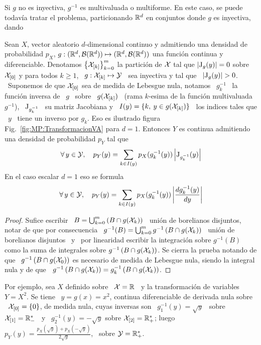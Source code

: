 Si $g$ no es inyectiva, $g^{-1}$  es multivaluada o multiforme. En este caso, se
puede todav\'ia  tratar el problema, particionando $\mathbb{R}^d$  en conjuntos donde
$g$ es inyectiva, dando
%
\begin{teorema}
  Sean $X$, vector aleatorio  $d$-dimensional continuo y admitiendo una densidad
  de  probabilidad   $p_X$,  $g:(\mathbb{R}^d  ,  \mathcal{B}(\mathbb{R}^d))   \mapsto  (\mathbb{R}^d  ,
  \mathcal{B}(\mathbb{R}^d))$  una  funci\'on continua  y  diferenciable.  Denotamos  $\left\{
    \mathcal{X}_{[k]} \right\}_{k=0}^m$ la partici\'on  de $\mathcal{X}$ tal que $\left| \operatorname{J}_g(y)
  \right| = 0$ sobre  $\mathcal{X}_{[0]}$ y para todos $k \ge 1$,  \ $g: \mathcal{X}_{[k]} \mapsto
  \mathcal{Y}$ \ sea inyectiva y tal que \ $\left| \operatorname{J}_g(y) \right| > 0$. \ Suponemos de
  que  $\mathcal{X}_{[0]}$ sea  de medida  de Lebesgue  nula, notamos  \ $g_k^{-1}$  \ la
  funci\'on inversa  de \ $g$  \ sobre \  $g(\mathcal{X}_{[k]})$ \ (rama $k$-esima  de la
  funci\'on multivaluada $g^{-1}$), \  $\operatorname{J}_{g_k^{-1}}$ \ su matriz Jacobiana y
  \ $I(y) = \{ k, \: y \in g(\mathcal{X}_{[k]}) \}$ \ los indices tales que \ $y$ \ tiene
  un      inverso     por      $g_k$.      Eso      es      ilustrado     figura
  Fig.~\ref{fig:MP:TransformacionVA}  para $d  = 1$.   Entonces $Y$  es continua
  admitiendo una densidad de probabilidad $p_Y$ tal que
  \[
  \forall  \, y  \in \mathcal{Y},  \quad p_Y(y)  = \sum_{k  \in  I(y)} p_X(g_k^{-1}(y))
  \left| \operatorname{J}_{g_k^{-1}}(y) \right|
  \]
  En el caso escalar $d = 1$ eso se formula
  \[
  \forall \, y \in \mathcal{Y}, \quad  p_Y(y) = \sum_{k \in I(y)} p_X(g_k^{-1}(y)) \left|
    \frac{d g_k^{-1}(y)}{dy} \right|
  \]
\end{teorema}
%
\begin{proof}
  Sufice escribir  \ $B  = \bigcup_{k =  0}^m \left(  B \cap g(\mathcal{X}_k)  \right)$ \
  uni\'on de borelianos disjuntos, notar  de que por consecuencia \ $g^{-1}(B) =
  \bigcup_{k =0}^m g^{-1}\left( B \cap  g(\mathcal{X}_k) \right)$ \ uni\'on de borelianos
  disjuntos \  y \  por linearidad escribir  la integraci\'on  sobre $g^{-1}(B)$
  como la  suma de  integrales sobre $g^{-1}\left(  B \cap g(\mathcal{X}_k)  \right)$. Se
  cierra la  prueba notando de  que \ $g^{-1}\left(  B \cap g(\mathcal{X}_0)  \right)$ es
  necesario  de medida de  Lebesgue nula,  siendo la  integral nula  y de  que \
  $g^{-1}\left( B \cap g(\mathcal{X}_k) \right) = g_k^{-1}\left( B \cap g(\mathcal{X}_k) \right)$.
\end{proof}
%
Por ejemplo, sea  $X$ definido sobre \  $\mathcal{X} = \mathbb{R}$ \ y  la transformaci\'on de
variables \ $Y =  X^2$.  Se tiene \ $y = g(x)  = x^2$, continua diferenciable de
derivada nula sobre \ $\mathcal{X}_{[0]} = \{ 0 \}$, de medida nula, cuyas inversas son \
$g_1^{-1}(y) = \sqrt{y}$  \ sobre $\mathcal{X}_{[1]} = \mathbb{R}_-^*$ \ y  \ $g_2^{-1}(y) = -
\sqrt{y}$ sobre $\mathcal{X}_{[2]} = \mathbb{R}_+^*$;  luego \ $p_Y(y) = \frac{p_X(\sqrt{y}) +
  p_X(-\sqrt{y})}{2 \sqrt{y}}$, \ sobre $\mathcal{Y} = \mathbb{R}_+^*$.

